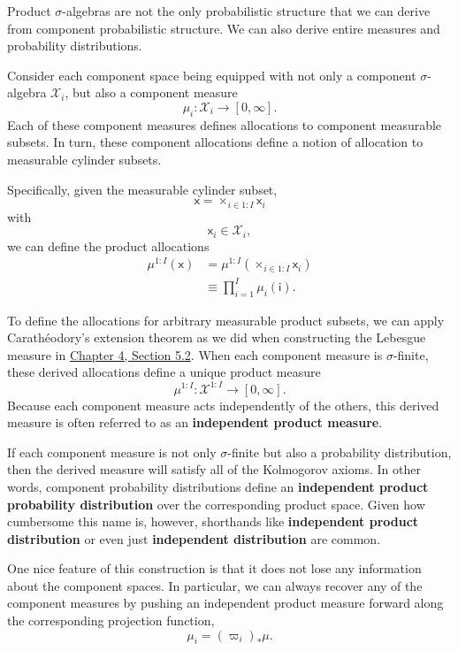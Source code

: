 \documentclass[
  letterpaper,
  DIV=11,
  numbers=noendperiod]{scrartcl}
\begin{document}
Product \(\sigma\)-algebras are not the only probabilistic structure
that we can derive from component probabilistic structure. We can also
derive entire measures and probability distributions.

Consider each component space being equipped with not only a component
\(\sigma\)-algebra \(\mathcal{X}_{i}\), but also a component measure \[
\mu_{i} : \mathcal{X}_{i} \rightarrow [0, \infty].
\] Each of these component measures defines allocations to component
measurable subsets. In turn, these component allocations define a notion
of allocation to measurable cylinder subsets.

Specifically, given the measurable cylinder subset, \[
\mathsf{x} = \times_{i \in 1:I} \mathsf{x}_{i}
\] with \[
\mathsf{x}_{i} \in \mathcal{X}_{i},
\] we can define the product allocations \begin{align*}
\mu^{1:I} ( \mathsf{x} )
&=
\mu^{1:I} \left(
  \times_{i \in 1:I} \mathsf{x}_{i}
\right)
\\
&\equiv
\prod_{i = 1}^{I} \mu_{i} ( \mathsf{i} ).
\end{align*}

To define the allocations for arbitrary measurable product subsets, we
can apply Carathéodory's extension theorem as we did when constructing
the Lebesgue measure in
\href{http://www.symplectomorphic.com/assets/chapters_html/probability_on_general_spaces.html\#sec:lebesgue}{Chapter
4, Section 5.2}. When each component measure is \(\sigma\)-finite, these
derived allocations define a unique product measure \[
\mu^{1:I} : \mathcal{X}^{1:I} \rightarrow [0, \infty].
\] Because each component measure acts independently of the others, this
derived measure is often referred to as an \textbf{independent product
measure}.

If each component measure is not only \(\sigma\)-finite but also a
probability distribution, then the derived measure will satisfy all of
the Kolmogorov axioms. In other words, component probability
distributions define an \textbf{independent product probability
distribution} over the corresponding product space. Given how cumbersome
this name is, however, shorthands like \textbf{independent product
distribution} or even just \textbf{independent distribution} are common.

One nice feature of this construction is that it does not lose any
information about the component spaces. In particular, we can always
recover any of the component measures by pushing an independent product
measure forward along the corresponding projection function, \[
\mu_{i} = ( \varpi_{i} )_{*} \mu.
\]
\end{document}
